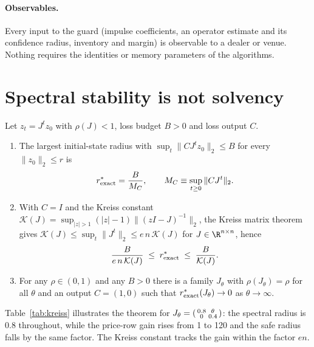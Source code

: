 \paragraph{Observables.} Every input to the guard (impulse coefficients, an operator estimate and its confidence radius, inventory and margin) is observable to a dealer or venue. Nothing requires the identities or memory parameters of the algorithms.

\section{Spectral stability is not solvency}\label{sec:radius}

\begin{theorem}\label{thm:radius}
Let $z_t=J^tz_0$ with $\rho(J)<1$, loss budget $B>0$ and loss output $C$.
\begin{enumerate}[label=(\roman*)]
\item The largest initial-state radius with $\sup_t\|CJ^tz_0\|_2\le B$ for every $\|z_0\|_2\le r$ is
\begin{equation}\label{eq:rexact}
r^*_{\rm exact}=\frac{B}{M_C},\qquad M_C\equiv\sup_{t\ge0}\|CJ^t\|_2 .
\end{equation}
\item With $C=I$ and the Kreiss constant $\mathcal K(J)=\sup_{|z|>1}(|z|-1)\|(zI-J)^{-1}\|_2$, the Kreiss matrix theorem gives $\mathcal K(J)\le\sup_t\|J^t\|_2\le e\,n\,\mathcal K(J)$ for $J\in\R^{n\times n}$, hence
\begin{equation}\label{eq:kreiss}
\frac{B}{e\,n\,\mathcal K(J)}\;\le\;r^*_{\rm exact}\;\le\;\frac{B}{\mathcal K(J)} .
\end{equation}
\item For any $\rho\in(0,1)$ and any $B>0$ there is a family $J_\theta$ with $\rho(J_\theta)=\rho$ for all $\theta$ and an output $C=(1,0)$ such that $r^*_{\rm exact}(J_\theta)\to0$ as $\theta\to\infty$.
\end{enumerate}
\end{theorem}

Table~\ref{tab:kreiss} illustrates the theorem for $J_\theta=\begin{psmallmatrix}0.8&\theta\\0&0.4\end{psmallmatrix}$: the spectral radius is $0.8$ throughout, while the price-row gain rises from 1 to 120 and the safe radius falls by the same factor. The Kreiss constant tracks the gain within the factor $en$.

